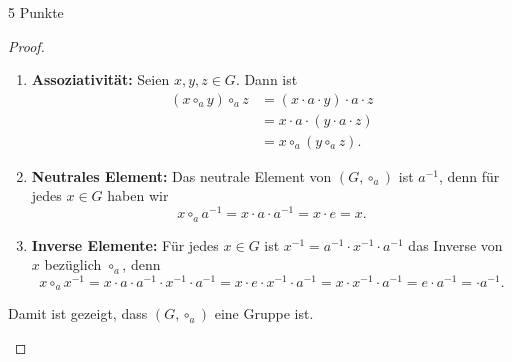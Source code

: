 \documentclass{problemset}
\begin{document}
\begin{problem} {5 Punkte}
\begin{proof}
\begin{enumerate}
\begin{enumerate}
			      \item \textbf{Assoziativität:} Seien $x, y, z \in G$. Dann ist
			            \begin{align*}
				            (x \circ_a y) \circ_a z & = (x \cdot a \cdot y) \cdot a \cdot z \\
				                                    & = x \cdot a \cdot (y \cdot a \cdot z) \\
				                                    & = x \circ_a (y \circ_a z).
			            \end{align*}

			      \item \textbf{Neutrales Element:} Das neutrale Element von $(G, \circ_a)$ ist $a^{-1}$, denn für jedes $x \in G$ haben wir
			            \[ x \circ_a a^{-1} = x \cdot a \cdot a^{-1} = x \cdot e = x. \]

			      \item \textbf{Inverse Elemente:} Für jedes $x \in G$ ist $x^{-1} = a^{-1} \cdot x^{-1} \cdot a^{-1}$ das Inverse von $x$ bezüglich $\circ_a$, denn
			            \[ x \circ_a x^{-1} = x \cdot a \cdot a^{-1} \cdot x^{-1} \cdot a^{-1} = x \cdot e \cdot x^{-1} \cdot a^{-1} =  x \cdot  x^{-1} \cdot a^{-1} = e \cdot a^{-1} = \cdot a^{-1}. \]

		      \end{enumerate}
		      Damit ist gezeigt, dass $(G, \circ_a)$ eine Gruppe ist. \checkmark
	\end{enumerate}
\end{proof}
\end{problem}
\end{document}
